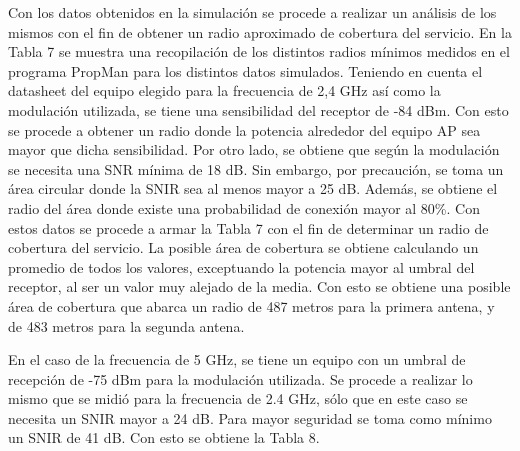 \documentclass[11pt,a4paper]{article}
\begin{document}
Con los datos obtenidos en la simulación se procede a realizar un análisis de los mismos con el fin de obtener un radio aproximado de cobertura del servicio. 
En la Tabla 7 se muestra una recopilación de los distintos radios mínimos medidos en el programa PropMan para los distintos datos simulados. 
Teniendo en cuenta el datasheet del equipo elegido para la frecuencia de 2,4 GHz así como la modulación utilizada, se tiene una sensibilidad del receptor de -84 dBm. 
Con esto se procede a obtener un radio donde la potencia alrededor del equipo AP sea mayor que dicha sensibilidad. 
Por otro lado, se obtiene que según la modulación se necesita una SNR mínima de 18 dB. 
Sin embargo, por precaución, se toma un área circular donde la SNIR sea al menos mayor a 25 dB. 
Además, se obtiene el radio del área donde existe una probabilidad de conexión mayor al 80\%. 
Con estos datos se procede a armar la Tabla 7 con el fin de determinar un radio de cobertura del servicio. 
La posible área de cobertura se obtiene calculando un promedio de todos los valores, exceptuando la potencia mayor al umbral del receptor, al ser un valor muy alejado de la media. 
Con esto se obtiene una posible área de cobertura que abarca un radio de 487 metros para la primera antena, y de 483 metros para la segunda antena.

\begin{table}[htbp]
\caption{posible área de cobertura del servicio para 2.4 GHz.}
\label{}
\end{table}


En el caso de la frecuencia de 5 GHz, se tiene un equipo con un umbral de recepción de -75 dBm para la modulación utilizada. Se procede a realizar lo mismo que se midió para la frecuencia de 2.4 GHz, sólo que en este caso se necesita un SNIR mayor a 24 dB. Para mayor seguridad se toma como mínimo un SNIR de 41 dB.  Con esto se obtiene la Tabla 8.
\end{document}
